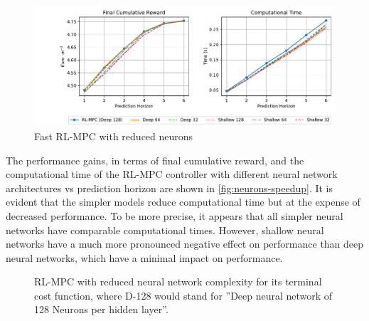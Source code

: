 \begin{figure}[H]
	\centering
	\includegraphics[width=\textwidth]{figures/speed_up_neurons.pdf}
	\caption{Fast RL-MPC with reduced neurons}
	\label{fig:neurons-speedup}
\end{figure}

The performance gains, in terms of final cumulative reward, and the computational time of the RL-MPC controller with different neural network architectures vs prediction horizon are shown in \autoref{fig:neurons-speedup}. It is evident that the simpler models reduce computational time but at the expense of decreased performance. To be more precise, it appears that all simpler neural networks have comparable computational times. However, shallow neural networks have a much more pronounced negative effect on performance than deep neural networks, which have a minimal impact on performance.

\begin{figure}[H]
	\centering
	\caption{RL-MPC with reduced neural network complexity for its terminal cost function, where D-128 would stand for ''Deep neural network of 128 Neurons per hidden layer''.}
	\label{fig:neurons-speedup-bar-graph}
\end{figure}

